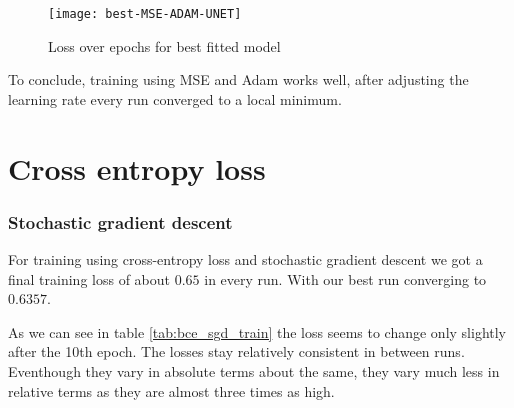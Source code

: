 \begin{figure}[h]
    \texttt{[image: best-MSE-ADAM-UNET]}
    \caption{\label{im:best-MSE-ADAM-UNET} Loss over epochs for best fitted model}
\end{figure}

To conclude, training using MSE and Adam works well, after adjusting the learning rate every run converged 
to a local minimum.

\section{Cross entropy loss}
\subsubsection{Stochastic gradient descent}
 For training using cross-entropy loss and stochastic gradient descent we got a final training loss
 of about $0.65$ in every run. With our best run converging to $0.6357$. 

 As we can see in table \ref{tab:bce_sgd_train} the loss seems to change only slightly after the 10th epoch.
 The losses stay relatively consistent in between runs. Eventhough they vary in absolute terms about the same,
 they vary much less in relative terms as they are almost three times as high.

 

